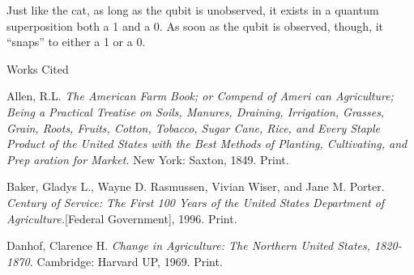 \documentclass[12pt]{article}
\newcommand{\bibent}{\noindent \hangindent 40pt}
\newenvironment{workscited}{\newpage \begin{center} Works Cited \end{center}}{\newpage }
\begin{document}
\begin{flushleft}
Just like the cat, as long as the qubit is unobserved, it exists in a quantum superposition both a 1 and a 0. As soon as the qubit is observed, though, it ``snaps'' to either a 1 or a 0. 

 
\newpage




\begin{workscited}

\bibent
Allen, R.L. \textit{The American Farm Book; or Compend of Ameri can Agriculture; Being a Practical Treatise on Soils, Manures, Draining, Irrigation, Grasses, Grain, Roots, Fruits, Cotton, Tobacco, Sugar Cane, Rice, and Every Staple Product of the United States with the Best Methods of Planting, Cultivating, and Prep aration for Market.} New York: Saxton, 1849. Print.

\bibent
Baker, Gladys L., Wayne D. Rasmussen, Vivian Wiser, and Jane M. Porter. \textit{Century of Service: The First 100 Years of the United States Department of Agriculture.}[Federal Government], 1996. Print.

\bibent
Danhof, Clarence H. \textit{Change in Agriculture: The Northern United States, 1820-1870.} Cambridge: Harvard UP, 1969. Print.


\end{workscited}

\end{flushleft}
\end{document}
